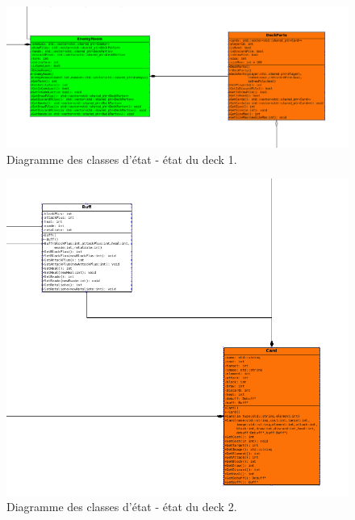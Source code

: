 \begin{landscape}
\begin{figure}[p]
\includegraphics[width=0.8\paperheight]{images/state4.png}
\caption{\label{uml:state}Diagramme des classes d'état - état du deck 1.} 
\end{figure}
\end{landscape}

\begin{landscape}
\begin{figure}[p]
\includegraphics[width=0.5\paperheight]{images/state5.png}
\caption{\label{uml:state}Diagramme des classes d'état - état du deck 2.} 
\end{figure}
\end{landscape}

